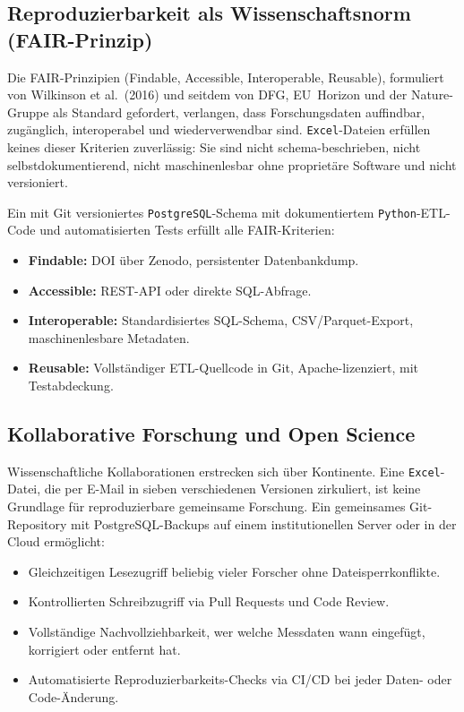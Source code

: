 ﻿\documentclass[12pt,a4paper]{report}
\theoremstyle{definition}
\theoremstyle{remark}
\newcommand{\excel}{\texttt{Excel}}
\newcommand{\pg}{\texttt{PostgreSQL}}
\newcommand{\py}{\texttt{Python}}
\begin{document}
\subsection{Reproduzierbarkeit als Wissenschaftsnorm (FAIR-Prinzip)}

Die FAIR-Prinzipien (Findable, Accessible, Interoperable, Reusable),
formuliert von Wilkinson et al.\ (2016) und seitdem von DFG,
EU~Horizon und der Nature-Gruppe als Standard gefordert, verlangen,
dass Forschungsdaten auffindbar, zugänglich, interoperabel und
wiederverwendbar sind.
\excel-Dateien erfüllen keines dieser Kriterien zuverlässig:
Sie sind nicht schema-beschrieben, nicht selbstdokumentierend,
nicht maschinenlesbar ohne proprietäre Software und nicht versioniert.

Ein mit Git versioniertes \pg-Schema mit dokumentiertem \py-ETL-Code
und automatisierten Tests erfüllt alle FAIR-Kriterien:
\begin{itemize}[leftmargin=1.5em, itemsep=2pt]
  \item \textbf{Findable:} DOI über Zenodo, persistenter Datenbankdump.
  \item \textbf{Accessible:} REST-API oder direkte SQL-Abfrage.
  \item \textbf{Interoperable:} Standardisiertes SQL-Schema,
        CSV/Parquet-Export, maschinenlesbare Metadaten.
  \item \textbf{Reusable:} Vollständiger ETL-Quellcode in Git,
        Apache-lizenziert, mit Testabdeckung.
\end{itemize}

\subsection{Kollaborative Forschung und Open Science}

Wissenschaftliche Kollaborationen erstrecken sich über Kontinente.
Eine \excel-Datei, die per E-Mail in sieben verschiedenen Versionen
zirkuliert, ist keine Grundlage für reproduzierbare gemeinsame
Forschung.
Ein gemeinsames Git-Repository mit PostgreSQL-Backups auf einem
institutionellen Server oder in der Cloud ermöglicht:
\begin{itemize}[leftmargin=1.5em, itemsep=2pt]
  \item Gleichzeitigen Lesezugriff beliebig vieler Forscher ohne
        Dateisperrkonflikte.
  \item Kontrollierten Schreibzugriff via Pull Requests und Code Review.
  \item Vollständige Nachvollziehbarkeit, wer welche Messdaten wann
        eingefügt, korrigiert oder entfernt hat.
  \item Automatisierte Reproduzierbarkeits-Checks via CI/CD bei jeder
        Daten- oder Code-Änderung.
\end{itemize}
\end{document}
